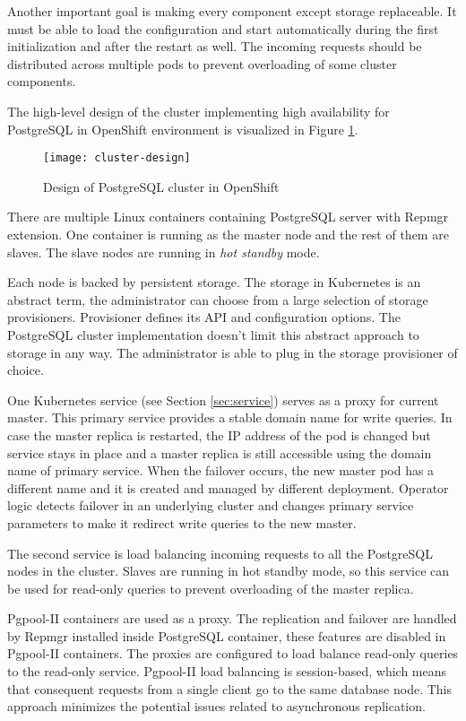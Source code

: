 \documentclass[
  digital, %
  twoside, %
  table,   %
  nolof,   %
  nolot,   %
]{fithesis3}
\begin{document}
Another important goal is making every component except storage replaceable. It must be able to load the configuration and start automatically during the first initialization and after the restart as well. The incoming requests should be distributed across multiple pods to prevent overloading of some cluster components.

The high-level design of the cluster implementing high availability for PostgreSQL in OpenShift environment is visualized in Figure \ref{fig:cluster_design}.

\begin{figure}[H]
\caption{Design of PostgreSQL cluster in OpenShift}
\centering
\texttt{[image: cluster-design]}
\label{fig:cluster_design}
\end{figure}

There are multiple Linux containers containing PostgreSQL server with Repmgr extension. One container is running as the master node and the rest of them are slaves. The slave nodes are running in \textit{hot standby} mode.

Each node is backed by persistent storage. The storage in Kubernetes is an abstract term, the administrator can choose from a large selection of storage provisioners. Provisioner defines its API and configuration options.  The PostgreSQL cluster implementation doesn't limit this abstract approach to storage in any way. The administrator is able to plug in the storage provisioner of choice.

One Kubernetes service (see Section \ref{sec:service}) serves as a proxy for current master. This primary service provides a stable domain name for write queries. In case the master replica is restarted, the IP address of the pod is changed but service stays in place and a master replica is still accessible using the domain name of primary service. When the failover occurs, the new master pod has a different name and it is created and managed by different deployment. Operator logic detects failover in an underlying cluster and changes primary service parameters to make it redirect write queries to the new master.

The second service is load balancing incoming requests to all the PostgreSQL nodes in the cluster. Slaves are running in hot standby mode, so this service can be used for read-only queries to prevent overloading of the master replica.

Pgpool-II containers are used as a proxy. The replication and failover are handled by Repmgr installed inside PostgreSQL container, these features are disabled in Pgpool-II containers. The proxies are configured to load balance read-only queries to the read-only service. Pgpool-II load balancing is session-based, which means that consequent requests from a single client go to the same database node. This approach minimizes the potential issues related to asynchronous replication.
\end{document}
